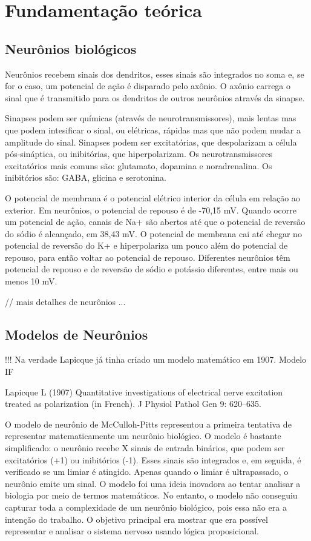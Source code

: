 \chapter{Fundamentação teórica}

\section{Neurônios biológicos}

Neurônios recebem sinais dos dendritos, esses sinais são integrados no soma e, se for o caso, um potencial de ação é disparado
pelo axônio. O axônio carrega o sinal que é transmitido para os dendritos de outros neurônios através da sinapse.

Sinapses podem ser químicas (através de neurotransmissores), mais lentas mas que podem intesificar o sinal, ou elétricas, rápidas
mas que não podem mudar a amplitude do sinal. Sinapses podem ser excitatórias, que despolarizam a célula pós-sináptica, ou
inibitórias, que hiperpolarizam. Os neurotransmissores excitatórios mais comuns são: glutamato, dopamina e noradrenalina. Os
inibitórios são: GABA, glicina e serotonina.

O potencial de membrana é o potencial elétrico interior da célula em relação ao exterior. Em neurônios, o potencial de repouso é
de -70,15 mV. Quando ocorre um potencial de ação, canais de Na+ são abertos até que o potencial de reversão do sódio é alcançado,
em 38,43 mV. O potencial de membrana cai até chegar no potencial de reversão do K+ e hiperpolariza um pouco além do potencial de
repouso, para então voltar ao potencial de repouso. Diferentes neurônios têm potencial de repouso e de reversão de sódio e
potássio diferentes, entre mais ou menos 10 mV.

// mais detalhes de neurônios
{...}

\section{Modelos de Neurônios}

!!! Na verdade Lapicque já tinha criado um modelo matemático em 1907. Modelo IF

Lapicque L (1907) Quantitative investigations of electrical
nerve excitation treated as polarization (in French). J
Physiol Pathol Gen 9: 620–635.

O modelo de neurônio de McCulloh-Pitts \cite{mccullochLogical1943} representou a primeira tentativa de representar matematicamente
um neurônio biológico. O modelo é bastante simplificado: o neurônio recebe X sinais de entrada binários, que podem ser
excitatórios (+1) ou inibitórios (-1). Esses sinais são integrados e, em seguida, é verificado se um limiar é atingido. Apenas
quando o limiar é ultrapassado, o neurônio emite um sinal. O modelo foi uma ideia inovadora ao tentar analisar a biologia por meio
de termos matemáticos. No entanto, o modelo não conseguiu capturar toda a complexidade de um neurônio biológico, pois essa não era
a intenção do trabalho. O objetivo principal era mostrar que era possível representar e analisar o sistema nervoso usando lógica
proposicional.

